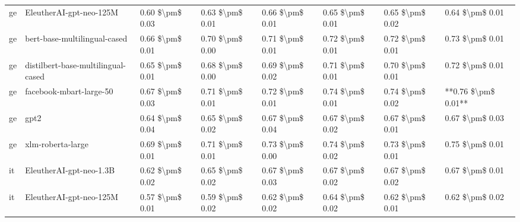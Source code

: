 \begin{tabular}{llllllll}
      ge &            EleutherAI-gpt-neo-125M & 0.60 \$\textbackslash pm\$ 0.03 &           0.63 \$\textbackslash pm\$ 0.01 &       0.66 \$\textbackslash pm\$ 0.01 &        0.65 \$\textbackslash pm\$ 0.01 &                         0.65 \$\textbackslash pm\$ 0.02 &     0.64 \$\textbackslash pm\$ 0.01 \\
      ge &       bert-base-multilingual-cased & 0.66 \$\textbackslash pm\$ 0.01 &           0.70 \$\textbackslash pm\$ 0.00 &       0.71 \$\textbackslash pm\$ 0.01 &        0.72 \$\textbackslash pm\$ 0.01 &                         0.72 \$\textbackslash pm\$ 0.01 &     0.73 \$\textbackslash pm\$ 0.01 \\
      ge & distilbert-base-multilingual-cased & 0.65 \$\textbackslash pm\$ 0.01 &           0.68 \$\textbackslash pm\$ 0.00 &       0.69 \$\textbackslash pm\$ 0.02 &        0.71 \$\textbackslash pm\$ 0.01 &                         0.70 \$\textbackslash pm\$ 0.01 &     0.72 \$\textbackslash pm\$ 0.01 \\
      ge &            facebook-mbart-large-50 & 0.67 \$\textbackslash pm\$ 0.03 &           0.71 \$\textbackslash pm\$ 0.01 &       0.72 \$\textbackslash pm\$ 0.01 &        0.74 \$\textbackslash pm\$ 0.01 &                         0.74 \$\textbackslash pm\$ 0.02 & **0.76 \$\textbackslash pm\$ 0.01** \\
      ge &                               gpt2 & 0.64 \$\textbackslash pm\$ 0.04 &           0.65 \$\textbackslash pm\$ 0.02 &       0.67 \$\textbackslash pm\$ 0.04 &        0.67 \$\textbackslash pm\$ 0.02 &                         0.67 \$\textbackslash pm\$ 0.01 &     0.67 \$\textbackslash pm\$ 0.03 \\
      ge &                  xlm-roberta-large & 0.69 \$\textbackslash pm\$ 0.01 &           0.71 \$\textbackslash pm\$ 0.01 &       0.73 \$\textbackslash pm\$ 0.00 &        0.74 \$\textbackslash pm\$ 0.02 &                         0.73 \$\textbackslash pm\$ 0.01 &     0.75 \$\textbackslash pm\$ 0.01 \\
      it &            EleutherAI-gpt-neo-1.3B & 0.62 \$\textbackslash pm\$ 0.02 &           0.65 \$\textbackslash pm\$ 0.02 &       0.67 \$\textbackslash pm\$ 0.03 &        0.67 \$\textbackslash pm\$ 0.02 &                         0.67 \$\textbackslash pm\$ 0.02 &     0.67 \$\textbackslash pm\$ 0.01 \\
      it &            EleutherAI-gpt-neo-125M & 0.57 \$\textbackslash pm\$ 0.01 &           0.59 \$\textbackslash pm\$ 0.02 &       0.62 \$\textbackslash pm\$ 0.02 &        0.64 \$\textbackslash pm\$ 0.02 &                         0.62 \$\textbackslash pm\$ 0.01 &     0.62 \$\textbackslash pm\$ 0.02 \\

\end{tabular}
